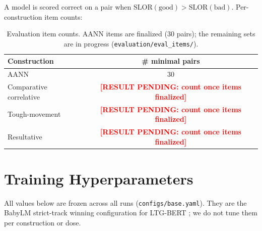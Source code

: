 \documentclass[11pt]{article}
\newcommand{\resultpending}[1]{%
  \textcolor{red}{\textbf{[RESULT PENDING: #1]}}}
\begin{document}
A model is scored correct on a pair when
$\mathrm{SLOR}(\text{good}) > \mathrm{SLOR}(\text{bad})$. Per-construction
item counts:

\begin{table}[h]
  \centering
  \small
  \begin{tabular}{lc}
    \toprule
    Construction & \# minimal pairs \\
    \midrule
    AANN                    & 30 \\
    Comparative correlative & \resultpending{count once items finalized} \\
    Tough-movement          & \resultpending{count once items finalized} \\
    Resultative             & \resultpending{count once items finalized} \\
    \bottomrule
  \end{tabular}
  \caption{Evaluation item counts. AANN items are finalized (30 pairs);
    the remaining sets are in progress (\texttt{evaluation/eval\_items/}).}
  \label{tab:item-counts}
\end{table}

\section{Training Hyperparameters}
\label{app:hyperparams}
All values below are frozen across all runs
(\texttt{configs/base.yaml}). They are the BabyLM strict-track winning
configuration for LTG-BERT \citep{samuel2023ltgbert}; we do not tune them
per construction or dose.
\end{document}
